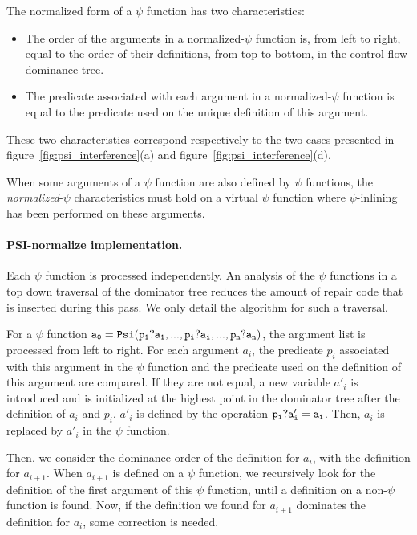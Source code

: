 The normalized form of a $\psi$ function has two characteristics:

\begin{itemize}
\item The order of the arguments in a normalized-$\psi$ function is,
from left to right, equal to the order of their definitions, from top
to bottom, in the control-flow dominance tree.
\item The predicate associated with each argument in a
normalized-$\psi$ function is equal to the predicate used on the
unique definition of this argument.
\end{itemize}

These two characteristics correspond respectively to the two cases
presented in figure~\ref{fig:psi_interference}(a) and
figure~\ref{fig:psi_interference}(d).

When some arguments of a $\psi$ function are also defined by $\psi$
functions, the {\em normalized}-$\psi$ characteristics must hold on a
virtual $\psi$ function where $\psi$-inlining has been performed on
these arguments.

\paragraph{PSI-normalize implementation.}

Each $\psi$ function is processed independently. An analysis of the
$\psi$ functions in a top down traversal of the dominator tree
reduces the amount of repair code that is inserted during this pass. We
only detail the algorithm for such a traversal.

For a $\psi$ function ${\tt a_0 = Psi(p_1?a_1, ..., p_i?a_i, ...,
  p_n?a_n)}$, the argument list is processed from left to right. For
each argument $a_i$, the predicate $p_i$ associated with this argument
in the $\psi$ function and the predicate used on the definition of
this argument are compared. If they are not equal, a new variable
$a'_i$ is introduced and is initialized at the highest point in the
dominator tree after the definition of $a_i$ and $p_i$. $a'_i$ is
defined by the operation ${\tt p_i? a'_i = a_i}$. Then, $a_i$ is
replaced by $a'_i$ in the $\psi$ function.

Then, we consider the dominance order of the definition for $a_i$,
with the definition for $a_{i+1}$. When $a_{i+1}$ is defined on a
$\psi$ function, we recursively look for the definition of the first
argument of this $\psi$ function, until a definition on a non-$\psi$
function is found. Now, if the definition we found for $a_{i+1}$
dominates the definition for $a_i$, some correction is needed.

